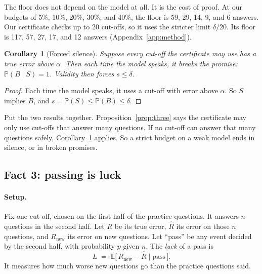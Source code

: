 \documentclass[11pt]{article}
\theoremstyle{plain}
\newtheorem{corollary}{Corollary}
\theoremstyle{definition}
\renewcommand{\Pr}{\mathbb{P}}
\newcommand{\E}{\mathbb{E}}
\newcommand{\Rnew}{R_{\mathrm{new}}}
\begin{document}
The floor does not depend on the model at all. It is the cost of proof. At our budgets of 5\%, 10\%, 20\%, 30\%, and 40\%, the floor is 59, 29, 14, 9, and 6 answers. Our certificate checks up to 20 cut-offs, so it uses the stricter limit $\delta/20$. Its floor is 117, 57, 27, 17, and 12 answers (Appendix~\ref{app:method}).

\begin{corollary}[Forced silence]
\label{cor:forced}
Suppose every cut-off the certificate may use has a true error above $\alpha$. Then each time the model speaks, it breaks the promise: $\Pr(B \mid S) = 1$. Validity then forces $s \le \delta$.
\end{corollary}

\begin{proof}
Each time the model speaks, it uses a cut-off with error above $\alpha$. So $S$ implies $B$, and $s = \Pr(S) \le \Pr(B) \le \delta$.
\end{proof}

Put the two results together. Proposition~\ref{prop:three} says the certificate may only use cut-offs that answer many questions. If no cut-off can answer that many questions safely, Corollary~\ref{cor:forced} applies. So a strict budget on a weak model ends in silence, or in broken promises.

\subsection{Fact 3: passing is luck}

\paragraph{Setup.} Fix one cut-off, chosen on the first half of the practice questions. It answers $n$ questions in the second half. Let $R$ be its true error, $\hat R$ its error on those $n$ questions, and $\Rnew$ its error on new questions. Let ``pass'' be any event decided by the second half, with probability $p$ given $n$. The \emph{luck} of a pass is
\[
L \;=\; \E\big[\, \Rnew - \hat R \;\big|\; \text{pass} \,\big].
\]
It measures how much worse new questions go than the practice questions said.
\end{document}

